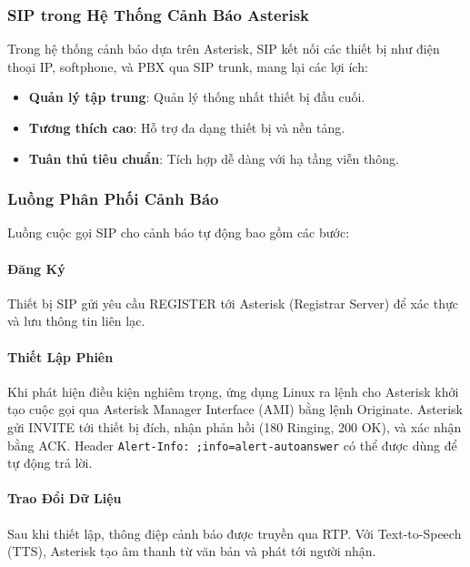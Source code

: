\subsubsection{SIP trong Hệ Thống Cảnh Báo Asterisk}
\label{subsubsec:sip_asterisk_integration}

Trong hệ thống cảnh báo dựa trên Asterisk, SIP kết nối các thiết bị như điện thoại IP, softphone, và PBX qua SIP trunk, mang lại các lợi ích:

\begin{itemize}
    \item \textbf{Quản lý tập trung}: Quản lý thống nhất thiết bị đầu cuối.
    \item \textbf{Tương thích cao}: Hỗ trợ đa dạng thiết bị và nền tảng.
    \item \textbf{Tuân thủ tiêu chuẩn}: Tích hợp dễ dàng với hạ tầng viễn thông.
\end{itemize}

\subsubsection{Luồng Phân Phối Cảnh Báo}
\label{subsubsec:sip_alert_flows}

Luồng cuộc gọi SIP cho cảnh báo tự động bao gồm các bước:

\paragraph{Đăng Ký}
Thiết bị SIP gửi yêu cầu REGISTER tới Asterisk (Registrar Server) để xác thực và lưu thông tin liên lạc.

\paragraph{Thiết Lập Phiên}
Khi phát hiện điều kiện nghiêm trọng, ứng dụng Linux ra lệnh cho Asterisk khởi tạo cuộc gọi qua Asterisk Manager Interface (AMI) bằng lệnh Originate. Asterisk gửi INVITE tới thiết bị đích, nhận phản hồi (180 Ringing, 200 OK), và xác nhận bằng ACK. Header \texttt{Alert-Info: ;info=alert-autoanswer} có thể được dùng để tự động trả lời.

\paragraph{Trao Đổi Dữ Liệu}
Sau khi thiết lập, thông điệp cảnh báo được truyền qua RTP. Với Text-to-Speech (TTS), Asterisk tạo âm thanh từ văn bản và phát tới người nhận.

